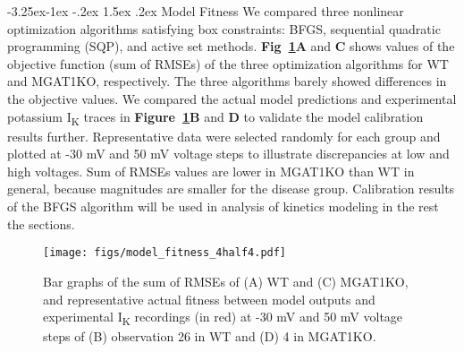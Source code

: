 \documentclass[11pt]{article}
\makeatletter
\renewcommand\subsection{\@startsection{subsection}{2}{\z@}%
                                     {-3.25ex\@plus -1ex \@minus -.2ex}%
                                     {1.5ex \@plus .2ex}%
                                     {\normalfont\fontfamily{phv}\fontsize{14}{17}\bfseries}}
\makeatother
\begin{document}
\subsection{Model Fitness}
We compared three nonlinear optimization algorithms satisfying box constraints: BFGS, sequential quadratic programming (SQP), and active set methods. \textbf{Fig~\ref{fig:model_fitness}A} and \textbf{C} shows values of the objective function (sum of RMSEs) of the three optimization algorithms for WT and MGAT1KO, respectively. The three algorithms barely showed differences in the objective values. We compared the actual model predictions and experimental potassium I\textsubscript{K} traces in \textbf{Figure~\ref{fig:model_fitness}B} and \textbf{D} to validate the model calibration results further. Representative data were selected randomly for each group and plotted at -30 mV and 50 mV voltage steps to illustrate discrepancies at low and high voltages. Sum of RMSEs values are lower in MGAT1KO than WT in general, because magnitudes are smaller for the disease group. Calibration results of the BFGS algorithm will be used in analysis of kinetics modeling in the rest the sections. 
\begin{figure}[!ht]
    \centering
    \texttt{[image: figs/model\_fitness\_4half4.pdf]}
    \caption{Bar graphs of the sum of RMSEs of (A) WT and (C) MGAT1KO, and representative actual fitness between model outputs and experimental I\textsubscript{K} recordings (in red) at -30 mV and 50 mV voltage steps of (B) observation 26 in WT and (D) 4 in MGAT1KO.}
    \label{fig:model_fitness}
\end{figure}
\end{document}
